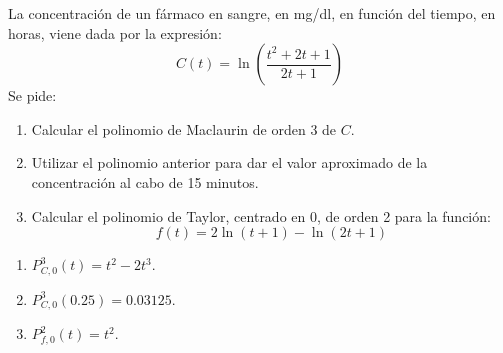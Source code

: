 {La concentración de un fármaco en sangre, en mg/dl, en función del tiempo, en horas, viene dada por la expresión:
\[
C(t) = \ln \left( {\frac{{t^2  + 2t + 1}}{{2t + 1}}} \right)
\]
Se pide:
\begin{enumerate}
\item Calcular el polinomio de Maclaurin de orden 3 de $C$.
\item Utilizar el polinomio anterior para dar el valor aproximado de la concentración al cabo de 15 minutos.
\item Calcular el polinomio de Taylor, centrado en 0, de orden 2 para la función:
\[
f(t) = 2\ln (t + 1) - \ln (2t + 1)
\]
\end{enumerate}
}
{\begin{enumerate}
\item $P_{C,0}^3(t) = t^2-2t^3$.
\item $P_{C,0}^3(0.25) = 0.03125$.
\item $P_{f,0}^2(t) = t^2$.
\end{enumerate}}
